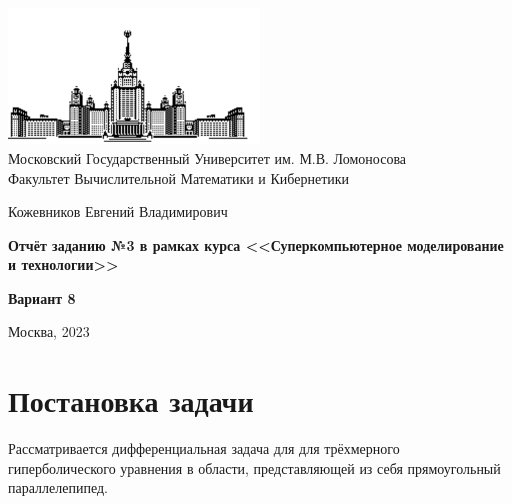 \documentclass[a4paper,hidelinks,12pt]{article}
\begin{document}
\begin {titlepage}
\thispagestyle{empty}

\begin{center}
\vspace{-1cm}

\includegraphics[width=0.5\textwidth]{msu}\\
Московский Государственный Университет им. М.В. Ломоносова\\
Факультет Вычислительной Математики и Кибернетики\\

\vspace{3cm}

{\Large Кожевников Евгений Владимирович}

\vspace{1cm}

{\LARGE\bfseries Отчёт заданию №3 в рамках курса <<Суперкомпьютерное моделирование\\ и технологии>>\par}

\vspace{1cm}

{\Large\bfseries Вариант 8}

\end{center}

\vfill

\begin{center}
Москва, 2023
\end{center}

\end{titlepage}

\setcounter{page}{2}
\onehalfspacing

\newpage
\tableofcontents

\setlength{\parskip}{0.8em}
\newpage

\section{Постановка задачи}

Рассматривается дифференциальная задача для для трёхмерного гиперболического уравнения в области, представляющей из себя прямоугольный параллелепипед.
\end{document}
